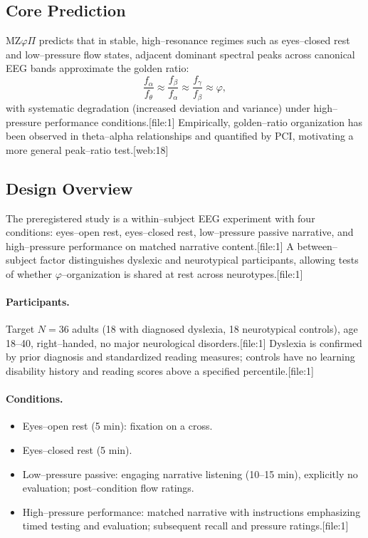 \documentclass[11pt]{article}
\begin{document}
\subsection{Core Prediction}

MZ$\varphi\Pi$ predicts that in stable, high--resonance regimes such as eyes--closed rest and low--pressure flow states, adjacent dominant spectral peaks across canonical EEG bands approximate the golden ratio:
\[
\frac{f_{\alpha}}{f_{\theta}} \approx
\frac{f_{\beta}}{f_{\alpha}} \approx
\frac{f_{\gamma}}{f_{\beta}} \approx \varphi,
\]
with systematic degradation (increased deviation and variance) under high--pressure performance conditions.[file:1]
Empirically, golden--ratio organization has been observed in theta--alpha relationships and quantified by PCI, motivating a more general peak--ratio test.\cite{GoldenEEG2026}[web:18]

\subsection{Design Overview}

The preregistered study is a within--subject EEG experiment with four conditions: eyes--open rest, eyes--closed rest, low--pressure passive narrative, and high--pressure performance on matched narrative content.[file:1]
A between--subject factor distinguishes dyslexic and neurotypical participants, allowing tests of whether $\varphi$--organization is shared at rest across neurotypes.[file:1]

\paragraph{Participants.}
Target $N=36$ adults (18 with diagnosed dyslexia, 18 neurotypical controls), age 18--40, right--handed, no major neurological disorders.[file:1]
Dyslexia is confirmed by prior diagnosis and standardized reading measures; controls have no learning disability history and reading scores above a specified percentile.[file:1]

\paragraph{Conditions.}
\begin{itemize}
\item Eyes--open rest (5 min): fixation on a cross.
\item Eyes--closed rest (5 min).
\item Low--pressure passive: engaging narrative listening (10--15 min), explicitly no evaluation; post--condition flow ratings.
\item High--pressure performance: matched narrative with instructions emphasizing timed testing and evaluation; subsequent recall and pressure ratings.[file:1]
\end{itemize}
\end{document}
